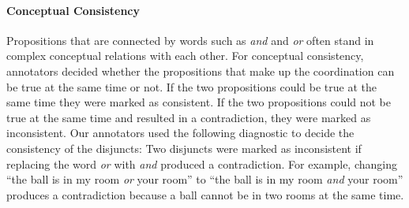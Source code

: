 \documentclass[floatsintext,man]{apa6}
\theoremstyle{definition}
\theoremstyle{definition}
\theoremstyle{definition}
\theoremstyle{remark}
\begin{document}
\paragraph{Conceptual Consistency}\label{conceptual-consistency}

Propositions that are connected by words such as \emph{and} and
\emph{or} often stand in complex conceptual relations with each other.
For conceptual consistency, annotators decided whether the propositions
that make up the coordination can be true at the same time or not. If
the two propositions could be true at the same time they were marked as
consistent. If the two propositions could not be true at the same time
and resulted in a contradiction, they were marked as inconsistent. Our
annotators used the following diagnostic to decide the consistency of
the disjuncts: Two disjuncts were marked as inconsistent if replacing
the word \emph{or} with \emph{and} produced a contradiction. For
example, changing \enquote{the ball is in my room \emph{or} your room}
to \enquote{the ball is in my room \emph{and} your room} produces a
contradiction because a ball cannot be in two rooms at the same time.
\end{document}
